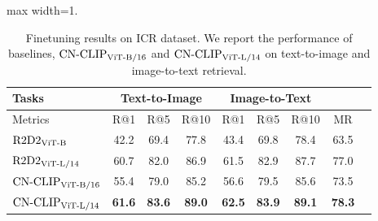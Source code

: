 \begin{table}[t]
\center
\small
\begin{adjustbox}{max width=1.\textwidth}
\begin{tabular}{@{\extracolsep{\fill}}lcccccccc}
\toprule
  Tasks
  &\multicolumn{3}{c}{Text-to-Image}
  &\multicolumn{3}{c}{Image-to-Text}
  & 
  \\
\midrule
  Metrics & R@1 & R@5 & R@10 & R@1 & R@5 & R@10 & MR
  \\
\midrule
  $\text{R2D2}\rm_{ViT\text{-}B}$
  & 42.2    & 69.4  & 77.8	& 43.4	& 69.8	& 78.4 & 63.5
  \\
  $\text{R2D2}\rm_{ViT\text{-}L/14}$
  & 60.7    & 82.0  & 86.9  & 61.5  & 82.9  & 87.7  & 77.0
  \\
  $\text{CN-CLIP}\rm_{ViT\text{-}B/16}$
  & 55.4    & 79.0  & 85.2  & 56.6  & 79.5  & 85.6  & 73.5
  \\
  $\text{CN-CLIP}\rm_{ViT\text{-}L/14}$
  & \textbf{61.6}    & \textbf{83.6}  & \textbf{89.0}  & \textbf{62.5}  & \textbf{83.9}  & \textbf{89.1}  & \textbf{78.3}
  \\

\bottomrule
\end{tabular}
\end{adjustbox}
\caption{Finetuning results on ICR dataset. We report the performance of baselines, $\text{CN-CLIP}\rm_{ViT\text{-}B/16}$ and $\text{CN-CLIP}\rm_{ViT\text{-}L/14}$ on text-to-image and image-to-text retrieval. }
\label{tb:ICR}
\end{table}